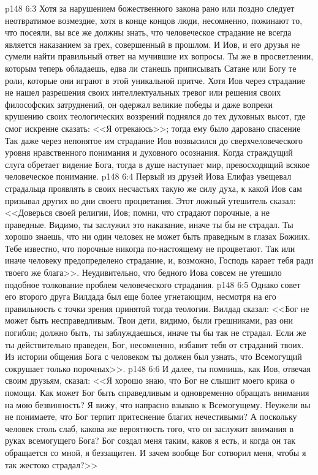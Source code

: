 \vs p148 6:3 Хотя за нарушением божественного закона рано или поздно следует неотвратимое возмездие, хотя в конце концов люди, несомненно, пожинают то, что посеяли, вы все же должны знать, что человеческое страдание не всегда является наказанием за грех, совершенный в прошлом. И Иов, и его друзья не сумели найти правильный ответ на мучившие их вопросы. Ты же в просветлении, которым теперь обладаешь, едва ли станешь приписывать Сатане или Богу те роли, которые они играют в этой уникальной притче. Хотя Иов через страдание не нашел разрешения своих интеллектуальных тревог или решения своих философских затруднений, он одержал великие победы и даже вопреки крушению своих теологических воззрений поднялся до тех духовных высот, где смог искренне сказать: <<Я отрекаюсь>>; тогда ему было даровано спасение  Так даже через непонятое им страдание Иов возвысился до сверхчеловеческого уровня нравственного понимания и духовного осознания. Когда страждущий слуга обретает видение Бога, тогда в душе наступает мир, превосходящий всякое человеческое понимание.
\vs p148 6:4 Первый из друзей Иова Елифаз увещевал страдальца проявлять в своих несчастьях такую же силу духа, к какой Иов сам призывал других во дни своего процветания. Этот ложный утешитель сказал: <<Доверься своей религии, Иов; помни, что страдают порочные, а не праведные. Видимо, ты заслужил это наказание, иначе ты бы не страдал. Ты хорошо знаешь, что ни один человек не может быть праведным в глазах Божиих. Тебе известно, что порочные никогда по\hyp{}настоящему не процветают. Так или иначе человеку предопределено страдание, и, возможно, Господь карает тебя ради твоего же блага>>. Неудивительно, что бедного Иова совсем не утешило подобное толкование проблем человеческого страдания.
\vs p148 6:5 Однако совет его второго друга Вилдада был еще более угнетающим, несмотря на его правильность с точки зрения принятой тогда теологии. Вилдад сказал: <<Бог не может быть несправедливым. Твои дети, видимо, были грешниками, раз они погибли; должно быть, ты заблуждаешься, иначе ты бы так не страдал. Если же ты действительно праведен, Бог, несомненно, избавит тебя от страданий твоих. Из истории общения Бога с человеком ты должен был узнать, что Всемогущий сокрушает только порочных>>.
\vs p148 6:6 И далее, ты помнишь, как Иов, отвечая своим друзьям, сказал: <<Я хорошо знаю, что Бог не слышит моего крика о помощи. Как может Бог быть справедливым и одновременно обращать внимания на мою безвинность? Я вижу, что напрасно взываю к Всемогущему. Неужели вы не понимаете, что Бог терпит притеснение благих нечестивыми? А поскольку человек столь слаб, какова же вероятность того, что он заслужит внимания в руках всемогущего Бога? Бог создал меня таким, каков я есть, и когда он так обращается со мной, я беззащитен. И зачем вообще Бог сотворил меня, чтобы я так жестоко страдал?>>
